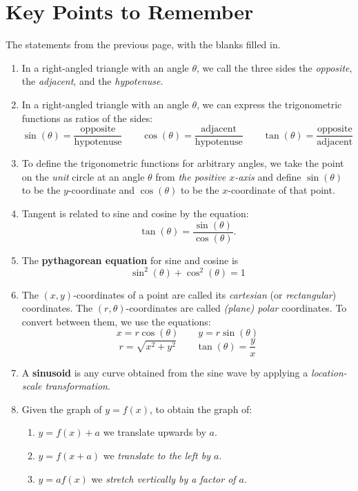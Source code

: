 \documentclass{article}
\begin{document}
\clearpage

\section{Key Points to Remember}

The statements from the previous page, with the blanks filled in.

\begin{enumerate}
\item In a right-angled triangle with an angle $\theta$, we call the three sides the \textit{opposite}, the \textit{adjacent}, and the \textit{hypotenuse}.
\item In a right-angled triangle with an angle $\theta$, we can express the trigonometric functions as ratios of the sides:
	\[\sin(\theta)=\frac{\mathrm{opposite}}{\mathrm{hypotenuse}}\qquad \cos(\theta)=\frac{\mathrm{adjacent}}{\mathrm{hypotenuse}}\qquad \tan(\theta)=\frac{\mathrm{opposite}}		{\mathrm{adjacent}}\]
\item To define the trigonometric functions for arbitrary angles, we take the point on the \textit{unit} circle at an angle $\theta$ from \textit{the positive $x$-axis} and define $\sin(\theta)$ to be the $y$-coordinate and $\cos(\theta)$ to be the $x$-coordinate of that point.
\item Tangent is related to sine and cosine by the equation:
	\[\tan(\theta) = \frac{\sin(\theta)}{\cos(\theta)}.\]
\item The \textbf{pythagorean equation} for sine and cosine is
	\[\sin^2(\theta)+\cos^2(\theta)=1\]
\item The $(x,y)$-coordinates of a point are called its \textit{cartesian} (or \textit{rectangular}) coordinates. The $(r,\theta)$-coordinates are called \textit{(plane) polar} coordinates. To convert between them, we use the equations:
	\[x=r\cos(\theta)\qquad y=r\sin(\theta)\]
	\[r=\sqrt{x^2+y^2}\qquad \tan(\theta)=\frac{y}{x}\]
\item A \textbf{sinusoid} is any curve obtained from the sine wave by applying a \textit{location-scale transformation}.
\item Given the graph of $y=f(x)$, to obtain the graph of:
	\begin{enumerate}
		\item $y=f(x)+a$ we translate upwards by $a$.
		\item $y=f(x+a)$ we \textit{translate to the left by $a$}.
		\item $y=af(x)$ we \textit{stretch vertically by a factor of $a$}.

\end{enumerate}
\end{enumerate}
\end{document}
